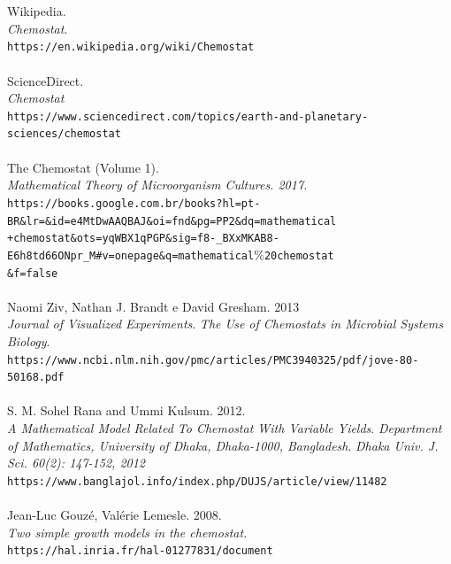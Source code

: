 \documentclass{article}
\begin{document}
\begin{thebibliography}{9}
\\\\
Wikipedia. 
\\
\textit{Chemostat}. 
\\\texttt{https://en.wikipedia.org/wiki/Chemostat}
\\\\
ScienceDirect.
\\
\textit{Chemostat}
\\\texttt{https://www.sciencedirect.com/topics/earth-and-planetary-sciences/chemostat}
\\\\
The Chemostat (Volume 1).
\\
\textit{Mathematical Theory of Microorganism Cultures. 2017.}
\\\texttt{https://books.google.com.br/books?hl=pt-BR\&lr=\&id=e4MtDwAAQBAJ\&oi=fnd\&pg=PP2\&dq=mathematical
\\+chemostat\&ots=yqWBX1qPGP\&sig=f8-\_BXxMKAB8-E6h8td66ONpr\_M\#v=onepage\&q=mathematical$\%$20chemostat
\\ \&f=false}
\\\\
Naomi Ziv, Nathan J. Brandt e David Gresham. 2013
\\
\textit{Journal of Visualized Experiments}.
\textit{The Use of Chemostats in Microbial Systems Biology}.
\\\texttt{https://www.ncbi.nlm.nih.gov/pmc/articles/PMC3940325/pdf/jove-80-50168.pdf}
\\\\
S. M. Sohel Rana and Ummi Kulsum. 2012.
\\
\textit{A Mathematical Model Related To Chemostat With Variable Yields}.
\textit{Department of Mathematics, University of Dhaka, Dhaka-1000, Bangladesh}.
\textit{Dhaka Univ. J. Sci. 60(2): 147-152, 2012}
\\\texttt{https://www.banglajol.info/index.php/DUJS/article/view/11482}
\\\\
Jean-Luc Gouzé, Valérie Lemesle. 2008.
\\
\textit{Two simple growth models in the chemostat.}
\\\texttt{https://hal.inria.fr/hal-01277831/document}
\\\\

\end{thebibliography}
\end{document}
